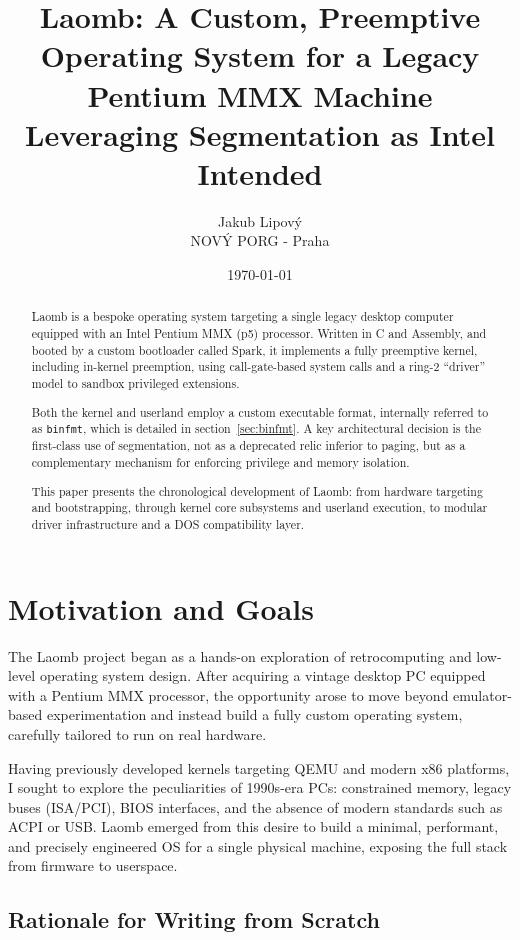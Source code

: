 \documentclass[12pt,a4paper]{report}
\title{%
	Laomb: A Custom, Preemptive Operating System for a Legacy Pentium MMX Machine\\
	\large Leveraging Segmentation as Intel Intended
}
\author{Jakub Lipový\\
	NOVÝ PORG - Praha}
\date{\today}
\begin{document}
		
	\maketitle
		
	\begin{abstract}
	Laomb is a bespoke operating system targeting a single legacy desktop computer equipped with an Intel Pentium MMX (p5) processor.  
	Written in C and Assembly, and booted by a custom bootloader called Spark, it implements a fully preemptive kernel, including in-kernel preemption, using call-gate-based system calls and a ring-2 “driver” model to sandbox privileged extensions.  

	Both the kernel and userland employ a custom executable format, internally referred to as \texttt{binfmt}, which is detailed in section~\ref{sec:binfmt}. A key architectural decision is the first-class use of segmentation, not as a deprecated relic inferior to paging, but as a complementary mechanism for enforcing privilege and memory isolation.

	This paper presents the chronological development of Laomb: from hardware targeting and bootstrapping, through kernel core subsystems and userland execution, to modular driver infrastructure and a DOS compatibility layer.
	\end{abstract}
		
	\tableofcontents
	\listoffigures
	\listoftables

	\chapter{Motivation and Goals}

	The Laomb project began as a hands-on exploration of retrocomputing and low-level operating system design. After acquiring a vintage desktop PC equipped with a Pentium MMX processor, the opportunity arose to move beyond emulator-based experimentation and instead build a fully custom operating system, carefully tailored to run on real hardware.

	Having previously developed kernels targeting QEMU and modern x86 platforms, I sought to explore the peculiarities of 1990s-era PCs: constrained memory, legacy buses (ISA/PCI), BIOS interfaces, and the absence of modern standards such as ACPI or USB. Laomb emerged from this desire to build a minimal, performant, and precisely engineered OS for a single physical machine, exposing the full stack from firmware to userspace.

	\section{Rationale for Writing from Scratch}
\end{document}
